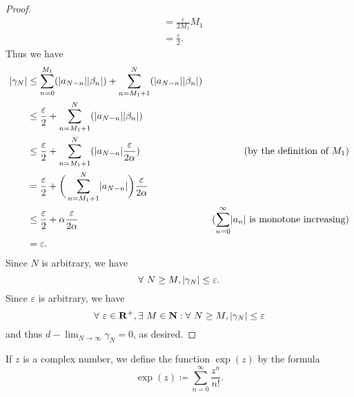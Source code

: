 \begin{proof}
\begin{align*}
                                                             & = \frac{\varepsilon}{2 M_1} M_1                                                                                                           \\
                                                             & = \frac{\varepsilon}{2}.
    \end{align*}
    Thus we have
    \begin{align*}
        \abs*{\gamma_N} & \leq \sum_{n = 0}^{M_1} (\abs*{a_{N - n}} \abs*{\beta_n}) + \sum_{n = M_1 + 1}^N (\abs*{a_{N - n}} \abs*{\beta_n})                                                                      \\
                        & \leq \frac{\varepsilon}{2} + \sum_{n = M_1 + 1}^N (\abs*{a_{N - n}} \abs*{\beta_n})                                                                                                     \\
                        & \leq \frac{\varepsilon}{2} + \sum_{n = M_1 + 1}^N (\abs*{a_{N - n}} \frac{\varepsilon}{2 \alpha})                  & \text{(by the definition of \(M_1\))}                              \\
                        & = \frac{\varepsilon}{2} + \bigg(\sum_{n = M_1 + 1}^N \abs*{a_{N - n}}\bigg) \frac{\varepsilon}{2 \alpha}                                                                                \\
                        & \leq \frac{\varepsilon}{2} + \alpha \frac{\varepsilon}{2 \alpha}                                                   & \text{(\(\sum_{n = 0}^\infty \abs*{a_n}\) is monotone increasing)} \\
                        & = \varepsilon.
    \end{align*}
    Since \(N\) is arbitrary, we have
    \[
        \forall\ N \geq M, \abs*{\gamma_N} \leq \varepsilon.
    \]
    Since \(\varepsilon\) is arbitrary, we have
    \[
        \forall\ \varepsilon \in \mathbf{R}^+, \exists\ M \in \mathbf{N} : \forall\ N \geq M, \abs*{\gamma_N} \leq \varepsilon
    \]
    and thus \(d - \lim_{N \to \infty} \gamma_N = 0\), as desired.
\end{proof}

\begin{definition}\label{4.6.15}
    If \(z\) is a complex number, we define the function \(\exp(z)\) by the formula
    \[
        \exp(z) \coloneqq \sum_{n = 0}^\infty \frac{z^n}{n!}.
    \]
\end{definition}


